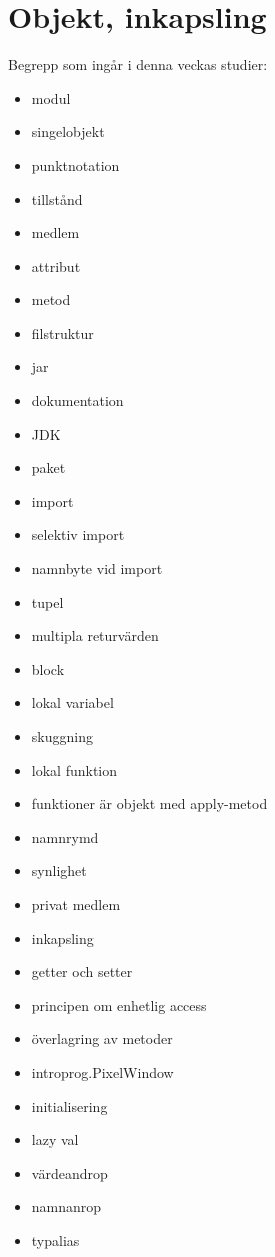 \chapter{Objekt, inkapsling}\label{chapter:W04}
Begrepp som ingår i denna veckas studier:
\begin{multicols}{2}\begin{itemize}[noitemsep,label={$\square$},leftmargin=*]
\item modul
\item singelobjekt
\item punktnotation
\item tillstånd
\item medlem
\item attribut
\item metod
\item filstruktur
\item jar
\item dokumentation
\item JDK
\item paket
\item import
\item selektiv import
\item namnbyte vid import
\item tupel
\item multipla returvärden
\item block
\item lokal variabel
\item skuggning
\item lokal funktion
\item funktioner är objekt med apply-metod
\item namnrymd
\item synlighet
\item privat medlem
\item inkapsling
\item getter och setter
\item principen om enhetlig access
\item överlagring av metoder
\item introprog.PixelWindow
\item initialisering
\item lazy val
\item värdeandrop
\item namnanrop
\item typalias\end{itemize}\end{multicols}
